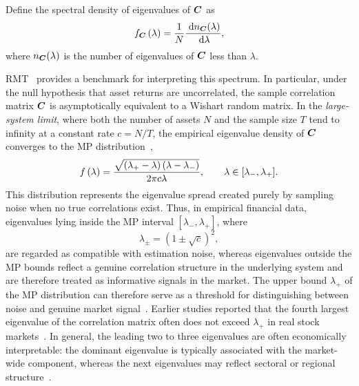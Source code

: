 \documentclass[pdflatex,sn-basic]{sn-jnl}%
\theoremstyle{thmstyleone}%
\theoremstyle{thmstyletwo}%
\theoremstyle{thmstylethree}%
\begin{document}
Define the spectral density of eigenvalues of $\boldsymbol{C}$ as
\begin{equation}
    \label{eqn:empirical_eigenvalue_distribution}
    f_{\boldsymbol{C}}\left( \lambda \right) = \frac{1}{N} \frac{\; \mathrm{d} n_{\boldsymbol{C}}(\lambda)}{\; \mathrm{d}\lambda},
\end{equation}
where $n_{\boldsymbol{C}}(\lambda)$ is the number of eigenvalues of $\boldsymbol{C}$ less than $\lambda$. 


RMT~\citep{bouchaud2003theory} provides a benchmark for interpreting this spectrum. 
In particular, under the null hypothesis that asset returns are uncorrelated,
the sample correlation matrix $\boldsymbol{C}$ is asymptotically equivalent to a Wishart random
matrix. In the \emph{large-system limit}, where both the number of assets $N$ and the
sample size $T$ tend to infinity at a constant rate $c = N/T$, the empirical
eigenvalue density of $\boldsymbol{C}$ converges to the MP distribution~\citep{marchenko1967distribution},
\begin{equation}
\label{eqn:mp_law}
    f\left( \lambda \right) = \frac{\sqrt{\left( \lambda_{+} - \lambda \right)\left( \lambda-\lambda_{-} \right)}}{2\pi c\lambda}, \qquad \lambda\in[\lambda_{-},\lambda_{+}].
\end{equation}
This distribution represents the eigenvalue spread created purely by sampling noise when no true correlations exist. Thus, in empirical financial data, eigenvalues lying inside the MP interval $[\lambda_-,\lambda_+]$, where
\begin{equation}
\label{eqn:mp_bounds}
    \lambda_{\pm} = \left(1 \pm \sqrt{c}\right)^2,
\end{equation}
are regarded as compatible with estimation noise, whereas eigenvalues outside the MP bounds reflect a genuine correlation structure in the underlying system and are therefore treated as informative signals in the market. 
The upper bound $\lambda_{+}$ of the MP distribution can therefore serve as a threshold for distinguishing between noise and genuine market signal~\citep{laloux1999noise, plerou2002random}. Earlier studies reported that the fourth largest eigenvalue of the correlation matrix often does not exceed $\lambda_{+}$ in real stock markets~\citep[e.g.,][]{molero2025random}. In general, the leading two to three eigenvalues are often economically interpretable: the dominant eigenvalue is typically associated with the market-wide component, whereas the next eigenvalues may reflect sectoral or regional structure~\citep{plerou2002random}.
\end{document}
